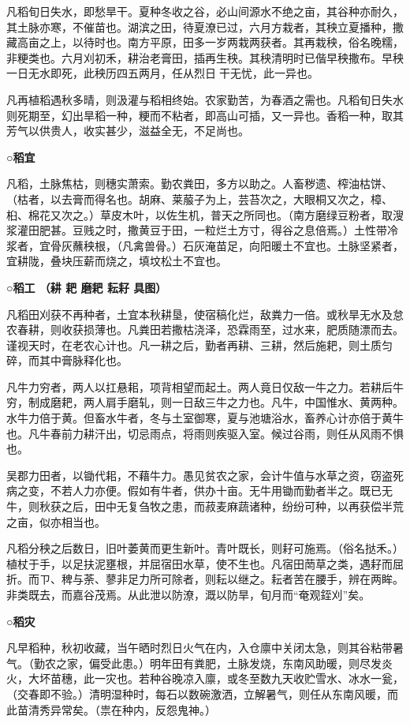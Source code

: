 \documentclass[]{article}
\begin{document}
凡稻旬日失水，即愁旱干。夏种冬收之谷，必山间源水不绝之亩，其谷种亦耐久，其土脉亦寒，不催苗也。湖滨之田，待夏潦已过，六月方栽者，其秧立夏播种，撒藏高亩之上，以待时也。南方平原，田多一岁两栽两获者。其再栽秧，俗名晚糯，非粳类也。六月刈初禾，耕治老膏田，插再生秧。其秧清明时已偕早秧撒布。早秧一日无水即死，此秧历四五两月，任从烈日干无忧，此一异也。

凡再植稻遇秋多晴，则汲灌与稻相终始。农家勤苦，为春酒之需也。凡稻旬日失水则死期至，幻出旱稻一种，粳而不粘者，即高山可插，又一异也。香稻一种，取其芳气以供贵人，收实甚少，滋益全无，不足尚也。

\textbf{○稻宜}

凡稻，土脉焦枯，则穗实萧索。勤农粪田，多方以助之。人畜秽遗、榨油枯饼、（枯者，以去膏而得名也。胡麻、莱菔子为上，芸苔次之，大眼桐又次之，樟、桕、棉花又次之。）草皮木叶，以佐生机，普天之所同也。（南方磨绿豆粉者，取溲浆灌田肥甚。豆贱之时，撒黄豆于田，一粒烂土方寸，得谷之息倍焉。）土性带冷浆者，宜骨灰蘸秧根，（凡禽兽骨。）石灰淹苗足，向阳暖土不宜也。土脉坚紧者，宜耕陇，叠块压薪而烧之，填坟松土不宜也。

\textbf{○稻工 （耕 耙 磨耙 耘耔 具图）}

凡稻田刈获不再种者，土宜本秋耕垦，使宿稿化烂，敌粪力一倍。或秋旱无水及怠农春耕，则收获损薄也。凡粪田若撒枯浇泽，恐霖雨至，过水来，肥质随漂而去。谨视天时，在老农心计也。凡一耕之后，勤者再耕、三耕，然后施耙，则土质匀碎，而其中膏脉释化也。

凡牛力穷者，两人以扛悬耜，项背相望而起土。两人竟日仅敌一牛之力。若耕后牛穷，制成磨耙，两人肩手磨轧，则一日敌三牛之力也。凡牛，中国惟水、黄两种。水牛力倍于黄。但畜水牛者，冬与土室御寒，夏与池塘浴水，畜养心计亦倍于黄牛也。凡牛春前力耕汗出，切忌雨点，将雨则疾驱入室。候过谷雨，则任从风雨不惧也。

吴郡力田者，以锄代耜，不藉牛力。愚见贫农之家，会计牛值与水草之资，窃盗死病之变，不若人力亦便。假如有牛者，供办十亩。无牛用锄而勤者半之。既已无牛，则秋获之后，田中无复刍牧之患，而菽麦麻蔬诸种，纷纷可种，以再获偿半荒之亩，似亦相当也。

凡稻分秧之后数日，旧叶萎黄而更生新叶。青叶既长，则耔可施焉。（俗名挞禾。）植杖于手，以足扶泥壅根，并屈宿田水草，使不生也。凡宿田菵草之类，遇耔而屈折。而ㄗ、稗与荼、蓼非足力所可除者，则耘以继之。耘者苦在腰手，辨在两眸。非类既去，而嘉谷茂焉。从此泄以防潦，溉以防旱，旬月而``奄观銍刈''矣。

\textbf{○稻灾}

凡早稻种，秋初收藏，当午晒时烈日火气在内，入仓廪中关闭太急，则其谷粘带暑气。（勤农之家，偏受此患。）明年田有粪肥，土脉发烧，东南风助暖，则尽发炎火，大坏苗穗，此一灾也。若种谷晚凉入廪，或冬至数九天收贮雪水、冰水一瓮，（交春即不验。）清明湿种时，每石以数碗激洒，立解暑气，则任从东南风暖，而此苗清秀异常矣。（祟在种内，反怨鬼神。）
\end{document}
